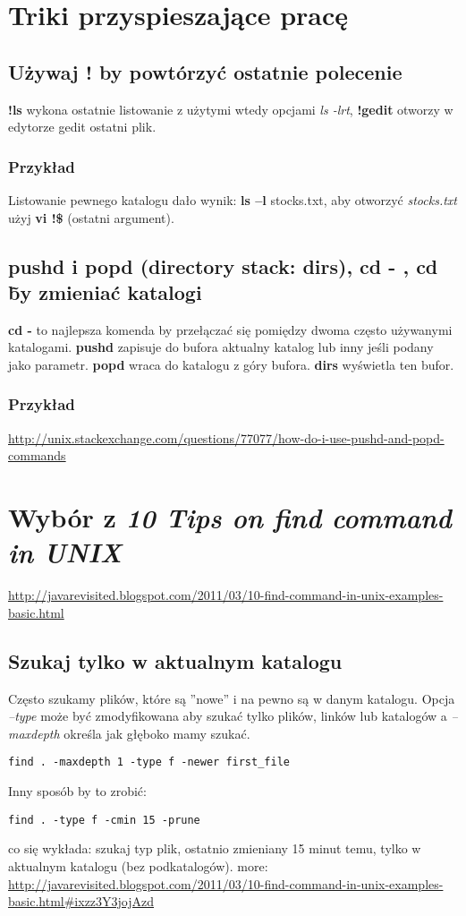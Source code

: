 \documentclass[a4paper,titlepage,12pt]{mwart}
\begin{document}
\section{Triki przyspieszające pracę}
\subsection{Używaj \textbf{!} by powtórzyć ostatnie polecenie}

\textbf{!ls} wykona ostatnie listowanie z użytymi wtedy opcjami \textit{ls -lrt}, \textbf{!gedit} otworzy w edytorze gedit ostatni plik.
\subsubsection{Przykład}
Listowanie pewnego katalogu dało wynik: \textbf{ls –l} stocks.txt, aby otworzyć \textit{stocks.txt} użyj \textbf{vi !\$} (ostatni argument).
\subsection{pushd i popd (directory stack: dirs), cd - , cd \~ by zmieniać katalogi}
\textbf{cd -} to najlepsza komenda by przełączać się pomiędzy dwoma często używanymi katalogami.\newline
\textbf{pushd} zapisuje do bufora aktualny katalog lub inny jeśli podany jako parametr.\newline
\textbf{popd} wraca do katalogu z góry bufora.\newline
\textbf{dirs} wyświetla ten bufor.
\subsubsection{Przykład}
\url{http://unix.stackexchange.com/questions/77077/how-do-i-use-pushd-and-popd-commands}
\section{Wybór z \textit{10 Tips on find command in UNIX}}
\url{http://javarevisited.blogspot.com/2011/03/10-find-command-in-unix-examples-basic.html}
\subsection{Szukaj tylko w aktualnym katalogu}
Często szukamy plików, które są ''nowe'' i na pewno są w danym katalogu. Opcja \textit{–type} może być zmodyfikowana aby szukać tylko plików, linków lub katalogów a \textit{–maxdepth} określa jak głęboko mamy szukać.
\begin{verbatim}
find . -maxdepth 1 -type f -newer first_file
\end{verbatim}
Inny sposób by to zrobić:
\begin{verbatim}
find . -type f -cmin 15 -prune
\end{verbatim}
co się wykłada: szukaj typ plik, ostatnio zmieniany 15 minut temu, tylko w aktualnym katalogu (bez podkatalogów).
more: \url{http://javarevisited.blogspot.com/2011/03/10-find-command-in-unix-examples-basic.html\#ixzz3Y3jojAzd}
\end{document}
